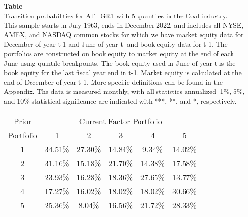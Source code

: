 \begin{table*}[ht!]
\raggedright
{}
\label{tab: transition_probs_AT_GR1_Coal_with_5_quantiles}
\textbf{Table \thetable} \\
Transition probabilities for AT_GR1 with 5 quantiles in the Coal industry. \\
\hspace*{1em}This sample starts in July 1963, ends in December 2022, and includes all NYSE, AMEX, and NASDAQ common stocks for which we have market equity data for December of year t-1 and June of year t, and book equity data for t-1. The portfolios are constructed on book equity to market equity at the end of each June using quintile breakpoints.  The book equity used in June of year t is the book equity for the last fiscal year end in t-1.  Market equity is calculated at the end of December of year t-1.  More specific definitions can be found in the Appendix.  The data is measured monthly, with all statistics annualized.  1\%, 5\%, and 10\% statistical significance are indicated with ***, **, and *, respectively. \\
\vspace{0.5em}
\centering
\begin{adjustbox}{max width=\textwidth}
\begin{tabular}{@{}cccccc@{}}
\toprule
Prior & \multicolumn{5}{c}{Current Factor Portfolio} \\
Portfolio & 1 & 2 & 3 & 4 & 5 \\
\midrule
1 & 34.51\% & 27.30\% & 14.84\% & 9.34\% & 14.02\% \\
2 & 31.16\% & 15.18\% & 21.70\% & 14.38\% & 17.58\% \\
3 & 23.93\% & 16.28\% & 18.36\% & 27.65\% & 13.77\% \\
4 & 17.27\% & 16.02\% & 18.02\% & 18.02\% & 30.66\% \\
5 & 25.36\% & 8.04\% & 16.56\% & 21.72\% & 28.33\% \\
\bottomrule
\end{tabular}
\end{adjustbox}
\end{table*}